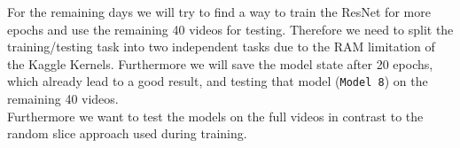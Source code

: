 \documentclass{article}
\begin{document}
\noindent
For the remaining days we will try to find a way to train the ResNet for more epochs and use the remaining 40 videos for testing. Therefore we need to split the training/testing task into two independent tasks due to the RAM limitation of the Kaggle Kernels. Furthermore we will save the model state after 20 epochs, which already lead to a good result, and testing that model (\texttt{Model 8}) on the remaining 40 videos.\\
Furthermore we want to test the models on the full videos in contrast to the random slice approach used during training.
\end{document}
